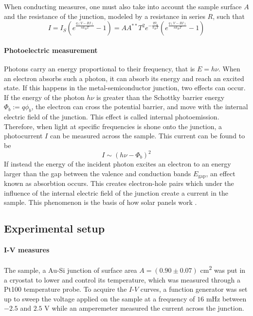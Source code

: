 When conducting measures, one must also take into account the sample surface $A$ and the resistance of the junction, modeled by a resistance in series $R$, such that
\begin{equation} \label{eq:iv_curve}
    I = I_S \left( e^{\frac{q (V- RI)}{n k_B T}} - 1\right) = A A^{**} T^2 e^{-\frac{q\phi_b}{k_BT}} \left( e^{\frac{q (V- RI)}{n k_B T}} - 1\right)
\end{equation}


\paragraph{Photoelectric measurement}
Photons carry an energy proportional to their frequency, that is $E = h \nu$.
When an electron absorbs such a photon, it can absorb its energy and reach an excited state.
If this happens in the metal-semiconductor junction, two effects can occur.
If the energy of the photon $h\nu$ is greater than the Schottky barrier energy $\Phi_b := q\phi_b$, the electron can cross the potential barrier, and move with the internal electric field of the junction.
This effect is called internal photoemission.
Therefore, when light at specific frequencies is shone onto the junction, a photocurrent $I$ can be measured across the sample.
This current can be found to be \cite{notice}
\begin{equation}
    I \sim (h \nu - \Phi_b)^2
    \label{eq:fowler}
\end{equation}
If instead the energy of the incident photon excites an electron to an energy larger than the gap between the valence and conduction bands $E_\textrm{gap}$, an effect known as absorbtion occurs.
This creates electron-hole pairs which under the influence of the internal electric field of the junction create a current in the sample.
This phenomenon is the basis of how solar panels work \cite{notice}.

\subsection{Experimental setup}
\paragraph{I-V measures}
The sample, a Au-Si junction of surface area $A = (0.90 \pm 0.07)$ \unit{\cm\squared} was put in a cryostat to lower and control its temperature, which was measured through a Pt100 temperature probe.
To acquire the $I$-$V$ curves, a function generator was set up to sweep the voltage applied on the sample at a frequency of $16$ mHz between $-2.5$ and $2.5$ V while an amperemeter measured the current across the junction. 

